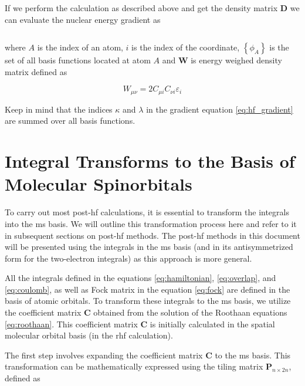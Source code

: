 If we perform the calculation as described above and get the density matrix \(\mathbf{D}\) we can evaluate the nuclear energy gradient as\cite{10.1002/9780470749593.hrs006}

\begin{equation}\label{eq:hf_gradient}
\end{equation}

where \(A\) is the index of an atom, \(i\) is the index of the coordinate, \(\left\lbrace\phi_A\right\rbrace\) is the set of all basis functions located at atom \(A\) and \(\mathbf{W}\) is energy weighed density matrix defined as

\begin{equation}
W_{\mu\nu}=2C_{\mu i}C_{\nu i}\varepsilon_i
\end{equation}

Keep in mind that the indices \(\kappa\) and \(\lambda\) in the gradient equation \eqref{eq:hf_gradient} are summed over all basis functions.

\section{\texorpdfstring{Integral Transforms to the Basis of Molecular Spinorbitals\label{sec:integral_transform}}{Integral Transforms to the Basis of Molecular Spinorbitals}}

To carry out most \acrfull{post-hf} calculations, it is essential to transform the integrals into the \acrfull{ms} basis. We will outline this transformation process here and refer to it in subsequent sections on \acrshort{post-hf} methods. The \acrshort{post-hf} methods in this document will be presented using the integrals in the \acrshort{ms} basis (and in its antisymmetrized form for the two-electron integrals) as this approach is more general.

All the integrals defined in the equations \eqref{eq:hamiltonian}, \eqref{eq:overlap}, and \eqref{eq:coulomb}, as well as Fock matrix in the equation \eqref{eq:fock} are defined in the basis of atomic orbitals. To transform these integrals to the \acrshort{ms} basis, we utilize the coefficient matrix \(\mathbf{C}\) obtained from the solution of the Roothaan equations \eqref{eq:roothaan}. This coefficient matrix \(\mathbf{C}\) is initially calculated in the spatial molecular orbital basis (in the \acrshort{rhf} calculation).

The first step involves expanding the coefficient matrix \(\mathbf{C}\) to the \acrshort{ms} basis. This transformation can be mathematically expressed using the tiling matrix \(\mathbf{P}_{n\times 2n}\), defined as

